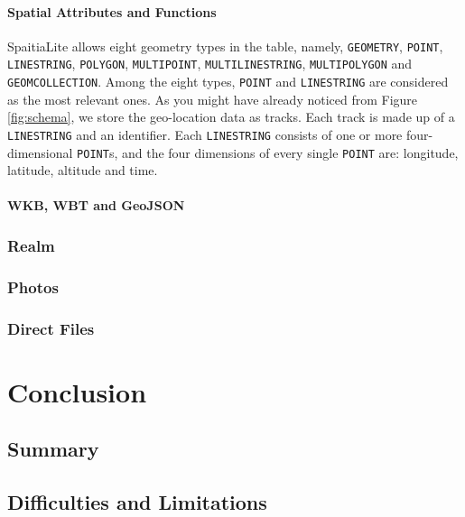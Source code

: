 \documentclass[12pt,a4paper]{article}
\begin{document}
                \paragraph{Spatial Attributes and Functions}
                SpaitiaLite allows eight geometry types in the table, namely, \texttt{GEOMETRY}, \texttt{POINT}, \texttt{LINESTRING}, \texttt{POLYGON}, \texttt{MULTIPOINT}, \texttt{MULTILINESTRING}, \texttt{MULTIPOLYGON} and \texttt{GEOMCOLLECTION}. Among the eight types, \texttt{POINT} and \texttt{LINESTRING} are considered as the most relevant ones. As you might have already noticed from Figure \ref{fig:schema}, we store the geo-location data as tracks. Each track is made up of a \texttt{LINESTRING} and an identifier. Each \texttt{LINESTRING} consists of one or more four-dimensional \texttt{POINT}s, and the four dimensions of every single \texttt{POINT} are: longitude, latitude, altitude and time.
                
                \paragraph{WKB, WBT and GeoJSON}
                
                
            \subsubsection{Realm} %
            \label{db:realm}
            \subsubsection{Photos} %
            \label{db:photo}
            \subsubsection{Direct Files} %
            \label{db:direct-files}
    \clearpage
    
    
    \section{Conclusion} 
        \subsection{Summary} %
        \subsection{Difficulties and Limitations} %
\end{document}
